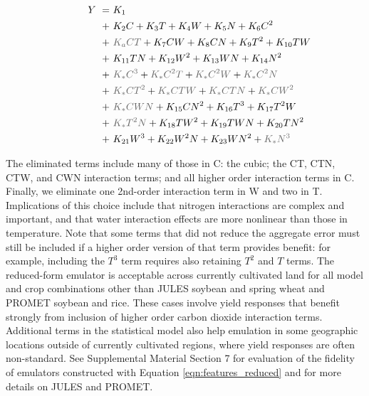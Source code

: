 \documentclass[gmdd]{copernicus} %
\begin{document}
\vspace{-0.1in}
\begin{align}
    \hspace{10mm}  \label{eqn:features_reduced}
        Y\ = \ & K_{1} \\
        + \ & K_{2} C                        + K_{3} T                        + K_{4} W                        + K_{5} N       + K_{6} C^2      \nonumber \\
        + \ & {\color{dark-gray}K_{a} C T}   + K_{7} C W                      + K_{8} C N                      + K_{9} T^2     + K_{10} T W     \nonumber \\
        + \ & K_{11} T N                     + K_{12} W^2                     + K_{13} W N                     + K_{14} N^2                     \nonumber \\
        + \ & {\color{dark-gray}K_{*} C^3}   + {\color{dark-gray}K_{*} C^2 T} + {\color{dark-gray}K_{*} C^2 W} + {\color{dark-gray}K_{*} C^2 N} \nonumber \\
        + \ & {\color{dark-gray}K_{*} C T^2} + {\color{dark-gray}K_{*} C T W} + {\color{dark-gray}K_{*} C T N} + {\color{dark-gray}K_{*} C W^2} \nonumber \\
        + \ & {\color{dark-gray}K_{*} C W N} + K_{15} C N^2                   + K_{16} T^3                     + K_{17} T^2 W                   \nonumber \\
        + \ & {\color{dark-gray}K_{*} T^2 N} + K_{18} T W^2                   + K_{19} T W N                   + K_{20} T N^2                   \nonumber \\
        + \ & K_{21} W^3                     + K_{22} W^2 N                   + K_{23} W N^2                   + {\color{dark-gray}K_{*} N^3}   \nonumber
\end{align}

\noindent The eliminated terms include many of those in C: the cubic; the CT, CTN, CTW, and CWN interaction terms; and all higher order interaction terms in C. 
Finally, we eliminate one 2nd-order interaction term in W and two in T. 
Implications of this choice include that nitrogen interactions are complex and important, and that water interaction effects are more nonlinear than those in temperature.  
Note that some terms that did not reduce the aggregate error must still be included if a higher order version of that term provides benefit: for example, including the $T^3$ term requires also retaining $T^2$ and $T$ terms. 
The reduced-form emulator is acceptable across currently cultivated land for all model and crop combinations other than JULES soybean and spring wheat and PROMET soybean and rice.
These cases involve yield responses that benefit strongly from inclusion of higher order carbon dioxide interaction terms. 
Additional terms in the statistical model also help emulation in some geographic locations outside of currently cultivated regions, where yield responses are often non-standard. 
See Supplemental Material Section 7 for evaluation of the fidelity of emulators constructed with Equation \ref{eqn:features_reduced} and for more details on JULES and PROMET.
\end{document}
